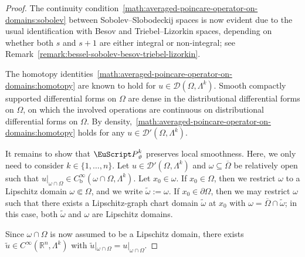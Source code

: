 \documentclass[10pt,a4paper]{amsart}
\theoremstyle{definition}
\theoremstyle{remark}
\numberwithin{equation}{section}
\newcommand{\bbR}{{\mathbb R}}
\newcommand{\calD}{{\mathcal D}}
\newcommand{\euP}{{\EuScript P}}
\newcommand{\closure}{\overline}
\renewcommand{\restriction}{|}
\newcommand{\Domain}{{\Omega}}
\newcommand{\subdomain}{{\omega}}
\newcommand{\Alt}[1]{\Lambda^{#1}}
\newcommand{\Poincare}{\euP}
\newcommand{\weight}{\vartheta}
\newcommand{\bounded}{\mathrm{b}}
\begin{document}
\begin{proof}
    


    The continuity condition~\eqref{math:averaged-poincare-operator-on-domains:sobolev} between Sobolev--Slobodeckij spaces is now evident due to the usual identification with Besov and Triebel--Lizorkin spaces, depending on whether both $s$ and $s+1$ are either integral or non-integral; see Remark~\ref{remark:bessel-sobolev-besov-triebel-lizorkin}. 
    
    


    The homotopy identities~\eqref{math:averaged-poincare-operator-on-domains:homotopy} are known to hold for $u \in \calD(\Domain,\Alt{k})$. 
    Smooth compactly supported differential forms on $\Domain$ are dense in the distributional differential forms on $\Domain$, 
    on which the involved operations are continuous on distributional differential forms on $\Domain$. 
    By density,~\eqref{math:averaged-poincare-operator-on-domains:homotopy} holds for any $u \in \calD'(\Domain,\Alt{k})$. 
    
    
    


    It remains to show that $\Poincare^{k}_{\weight}$ preserves local smoothness.
    Here, we only need to consider $k \in \{1,\dots,n\}$. 
    Let $u \in \calD'(\Domain,\Alt{k})$ and $\subdomain \subseteq \closure\Domain$ be relatively open 
    such that $u \restriction_{\subdomain \cap \Domain} \in C^{\infty}_{\bounded}(\subdomain \cap \Domain,\Alt{k})$.
    Let $x_{0} \in \subdomain$. 
    If $x_{0} \in \Domain$, then we restrict $\subdomain$ to a Lipschitz domain $\subdomain \Subset \Domain$, 
    and we write $\widetilde\subdomain := \subdomain$. 
    If $x_{0} \in \partial\Domain$, then we may restrict $\subdomain$ such that there exists a Lipschitz-graph chart domain $\widetilde\subdomain$ at $x_{0}$ with $\subdomain = \closure\Domain \cap \widetilde\subdomain$;
    in this case, both $\widetilde\subdomain$ and $\subdomain$ are Lipschitz domains.
    
    Since $\subdomain \cap \Domain$ is now assumed to be a Lipschitz domain, 
    there exists $\widetilde{u} \in C^{\infty}(\bbR^{n},\Alt{k})$ with $\widetilde{u} \restriction_{\subdomain \cap \Domain} = u \restriction_{\subdomain \cap \Domain}$. 
    

\end{proof}
\end{document}
